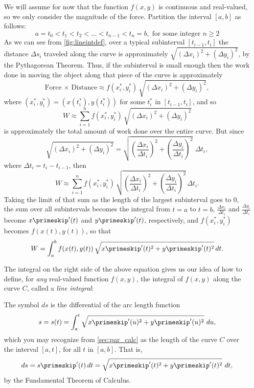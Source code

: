 We will assume for now that the function $f(x,y)$ is continuous and real-valued, so we only consider the magnitude of the force. Partition the interval $[a,b]$ as follows:
\[
 a = t_0 < t_1 < t_2 < \dots < t_{n-1} < t_n = b ,\text{ for some integer $n \ge 2$}
\]
As we can see from \autoref{fig:lineintdef}, over a typical subinterval $[t_{i-1},t_i]$ the distance $\Delta s_i$ traveled along the curve is approximately $\sqrt{(\Delta x_i)^2+(\Delta y_i)^2}$, by the Pythagorean Theorem. Thus, if the subinterval is small enough then the work done in moving the object along that piece of the curve is approximately
\[
 \text{Force}\,\times\,\text{Distance}
 \approx f(x_{i}^*,y_{i}^*)\,\sqrt{(\Delta x_i)^2 +(\Delta y_i)^2} ,
\]
where $(x_{i}^*,y_{i}^*)=(x(t_i^*),y(t_i^*))$ for some $t_i^*$ in $[t_{i-1},t_i]$, and so
\[
 W \approx \sum_{i=1}^n f(x_i^*,y_i^*)\,\sqrt{(\Delta x_i)^2 +(\Delta y_i)^2}
\]
is approximately the total amount of work done over the entire curve. But since
\[
 \sqrt{(\Delta x_i)^2+(\Delta y_i)^2}
 =\sqrt{\left(\frac{\Delta x_i}{\Delta t_i}\right)^2
 +\left(\frac{\Delta y_i}{\Delta t_i}\right)^2} \,\,\Delta t_i ,
\]
where $\Delta t_i=t_i-t_{i-1}$, then
\[
 W \approx \sum_{i=1}^n f(x_i^*,y_i^*)\,
 \sqrt{\left(\frac{\Delta x_i}{\Delta t_i}\right)^2
 +\left(\frac{\Delta y_i}{\Delta t_i}\right)^2} \,\Delta t_i .
\]
Taking the limit of that sum as the length of the largest subinterval goes to $0$, the sum over all subintervals becomes the integral from $t=a$ to $t=b$, $\frac{\Delta x_i}{\Delta t_i}$ and $\frac{\Delta y_i}{\Delta t_i}$ become $x\primeskip'(t)$ and $y\primeskip'(t)$, respectively, and $f(x_i^*,y_i^*)$ becomes $f(x(t),y(t))$, so that
\[
 W = \int_a^b f(x(t),y(t)) \,\sqrt{x\primeskip'(t)^2 + y\primeskip'(t)^2}\,dt .
\]

The integral on the right side of the above equation gives us our idea of how to define, for \emph{any} real-valued function $f(x,y)$, the integral of $f(x,y)$ along the curve $C$, called a \emph{line integral}:


The symbol $ds$ is the differential of the arc length function
\[
 s = s(t) = \int_a^t \sqrt{x\primeskip'(u)^2 + y\primeskip'(u)^2}\,\,du ,
\]
which you may recognize from \autoref{sec:par_calc} as the length of the curve $C$ over the interval $[a,t]$, for all $t$ in $[a,b]$. That is,
\[
 ds = s\primeskip'(t)\,dt = \sqrt{x\primeskip'(t)^2 + y\primeskip'(t)^2}\,\,dt ,
\]
by the Fundamental Theorem of Calculus.

